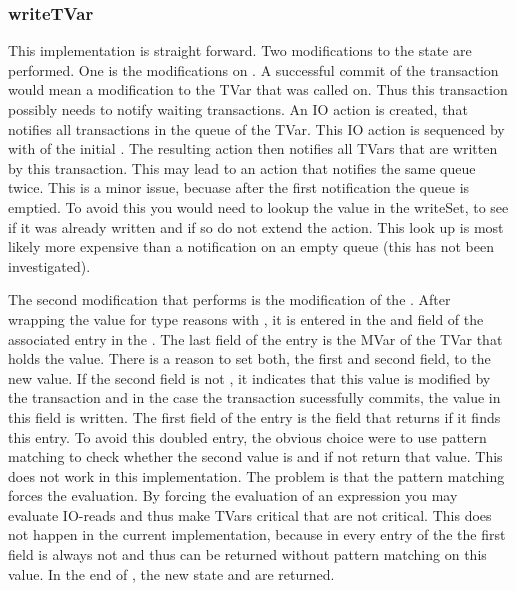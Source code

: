 \subsubsection{writeTVar}
This implementation is straight forward. Two modifications to the state are performed. One is
the modifications on . A successful commit of the transaction would mean a 
modification to the TVar that  was called on. Thus this transaction 
possibly needs to notify waiting transactions. An IO action is created, that notifies
all transactions in the queue of the TVar. This IO action is sequenced by \code{>>} with 
 of the initial . The resulting action then notifies all
TVars that are written by this transaction. This may lead to an action that notifies the 
same queue twice. This is a minor issue, becuase after the first notification the queue 
is emptied. To avoid this you would need to lookup the value in the writeSet, to see if 
it was already written and if so do not extend the  action. This look up
is most likely more expensive than a notification on an empty queue (this has not been 
investigated). 

The second modification that  performs is the modification of the .
After wrapping the value for type reasons with , it is entered in the  and  
field of the associated entry in the . The last field of the entry is the MVar of
the TVar that holds the value. There is a reason to set both, the first and second field, to the
new value. If the second field is not , it indicates that this value is modified 
by the transaction and in the case the transaction sucessfully commits, the value in this field
is written. The first field of the entry is the field that  returns if it finds
this entry. To avoid this doubled entry, the obvious choice were to use pattern matching to 
check whether the second value is  and if not return that value. This does not
work in this implementation. The problem is that the pattern matching forces the evaluation.
By forcing the evaluation of an expression you may evaluate IO-reads and thus make TVars critical
that are not critical. This does not happen in the current implementation, because in every entry
of the  the first field is always not  and thus can be returned
without pattern matching on this value. 
In the end of , the new state and \code{()} are returned.


